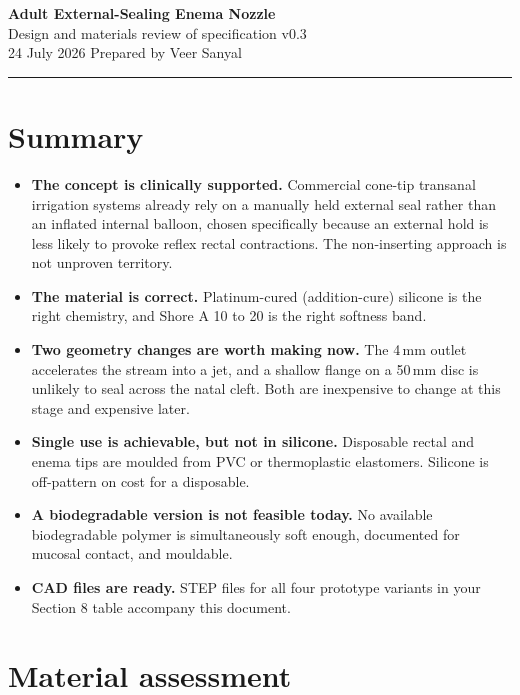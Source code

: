 \documentclass[11pt]{article}
\begin{document}
\begin{center}
  {\sffamily\LARGE\bfseries Adult External-Sealing Enema Nozzle}\\[0.35em]
  {\sffamily\large\color{slate} Design and materials review of specification v0.3}\\[0.9em]
  {\sffamily\footnotesize\color{slate} 24 July 2026 \quad\textbullet\quad Prepared by Veer Sanyal}
\end{center}

\vspace{0.6em}
\noindent\textcolor{rule}{\rule{\linewidth}{0.8pt}}
\vspace{0.9em}

\section{Summary}

\begin{itemize}
  \item \textbf{The concept is clinically supported.} Commercial cone-tip transanal irrigation systems already rely on a manually held external seal rather than an inflated internal balloon, chosen specifically because an external hold is less likely to provoke reflex rectal contractions. The non-inserting approach is not unproven territory.
  \item \textbf{The material is correct.} Platinum-cured (addition-cure) silicone is the right chemistry, and Shore A 10 to 20 is the right softness band.
  \item \textbf{Two geometry changes are worth making now.} The 4\,mm outlet accelerates the stream into a jet, and a shallow flange on a 50\,mm disc is unlikely to seal across the natal cleft. Both are inexpensive to change at this stage and expensive later.
  \item \textbf{Single use is achievable, but not in silicone.} Disposable rectal and enema tips are moulded from PVC or thermoplastic elastomers. Silicone is off-pattern on cost for a disposable.
  \item \textbf{A biodegradable version is not feasible today.} No available biodegradable polymer is simultaneously soft enough, documented for mucosal contact, and mouldable.
  \item \textbf{CAD files are ready.} STEP files for all four prototype variants in your Section 8 table accompany this document.
\end{itemize}

\section{Material assessment}
\end{document}
